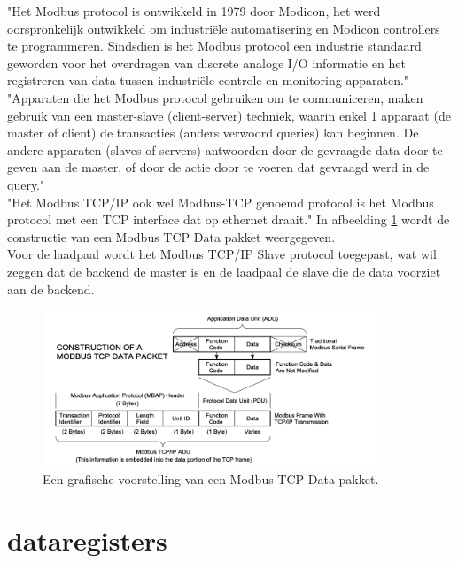 "Het Modbus protocol is ontwikkeld in 1979 door Modicon, het werd oorspronkelijk ontwikkeld om industriële automatisering en Modicon controllers te programmeren. Sindsdien is het Modbus protocol een industrie standaard geworden voor het overdragen van discrete analoge I/O informatie en het registreren van data tussen industriële controle en monitoring apparaten." \autocite{Acromag2005} \\

"Apparaten die het Modbus protocol gebruiken om te communiceren, maken gebruik van een master-slave (client-server) techniek, waarin enkel 1 apparaat (de master of client) de transacties (anders verwoord queries) kan beginnen. De andere apparaten (slaves of servers) antwoorden door de gevraagde data door te geven aan de master, of door de actie door te voeren dat gevraagd werd in de query." \autocite{Acromag2005} \\

"Het Modbus TCP/IP ook wel Modbus-TCP genoemd protocol is het Modbus protocol met een TCP interface dat op ethernet draait." \autocite{Acromag2005} In afbeelding \ref{fig:modbus-data-pakket} wordt de constructie van een Modbus TCP Data pakket weergegeven.\\

Voor de laadpaal wordt het Modbus TCP/IP Slave protocol toegepast, wat wil zeggen dat de backend de master is en de laadpaal de slave die de data voorziet aan de backend.

\begin{figure}[h]
    \includegraphics[width=10cm]{./graphics/Modbus-TCP-schema.png}
    \caption{Een grafische voorstelling van een Modbus TCP Data pakket. \autocite{Acromag2005}}
    \label{fig:modbus-data-pakket}
\end{figure}

\section{dataregisters}
\label{sec:stand-van-zaken-dataregisters}

